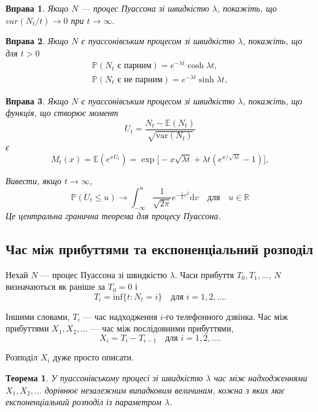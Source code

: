 \documentclass[12pt,fleqn]{article}
\newtheorem{theorem}{Теорема}[section]
\newtheorem{exercise}{Вправа}[section]
\numberwithin{figure}{section}
\numberwithin{equation}{section}
\begin{document}
\begin{exercise}
  Якщо $N$ --- процес Пуассона зі швидкістю $\lambda$, покажіть, що $var(N_t/t)\rightarrow 0$ при $t \rightarrow \infty$.
\end{exercise}

\begin{exercise}
  Якщо $N$ є пуассонівським процесом зі швидкістю $\lambda$, покажіть, що для $t>0$
  \begin{gather*}
    \mathbb{P}(N_t \text{ є парним})=e^{-\lambda t} \cosh \lambda t, \\
    \mathbb{P}(N_t \text{ є не парним})=e^{-\lambda t} \sinh \lambda t,
  \end{gather*}
\end{exercise}

\begin{exercise}\label{exercise.11.20}
  Якщо $N$ є пуассонівським процесом зі швидкістю $\lambda$, покажіть, що функція, що створює момент
  $$U_t=\frac{N_t-\mathbb{E}(N_t)}{\sqrt{\text{var}(N_t)}}$$
  є
  $$M_t(x)=\mathbb{E}(e^{xU_t})=\exp\big[-x\sqrt{\lambda t}+\lambda t(e^{x/\sqrt{\lambda t}} -1)\big],$$

  Вивести, якщо $t\rightarrow \infty$,
  $$\mathbb{P}(U_t\leq u) \rightarrow \int_{-\infty}^{u}\frac{1}{\sqrt{2\pi}}e^{-\frac{1}{2}v^2}\mathrm{d}v \quad \text{для} \quad u \in \mathbb{R}$$
  Це центральна гранична теорема для процесу Пуассона.
\end{exercise}

\subsection{Час між прибуттями та експоненціальний розподіл}
Нехай $N$ --- процес Пуассона зі швидкістю $\lambda$. Часи прибуття $T_0, T_1, \dots$, $N$ визначаються як раніше за $T_0=0$ і
\begin{equation}\label{11.21}
  T_i=\text{inf}\{t: N_t=i\} \quad \text{для $i = 1, 2, \dots.$}
\end{equation}

Іншими словами, $T_i$ --- час надходження $i$-го телефонного дзвінка. Час між прибуттями $X_1, X_2, \dots$ --- час між послідовними прибуттями,
\begin{equation}\label{11.22}
  X_i=T_i-T_{i-1} \quad \text{для $i = 1, 2, \dots.$}
\end{equation}

Розподіл $X_i$ дуже просто описати.

\begin{theorem}\label{theorem.11.23}
  У пуассонівському процесі зі швидкістю $\lambda$ час між надходженнями $X_1, X_2, \dots$ дорівнює незалежним випадковим величинам, кожна з яких має експоненціальний розподіл із параметром $\lambda$.
\end{theorem}
\end{document}
